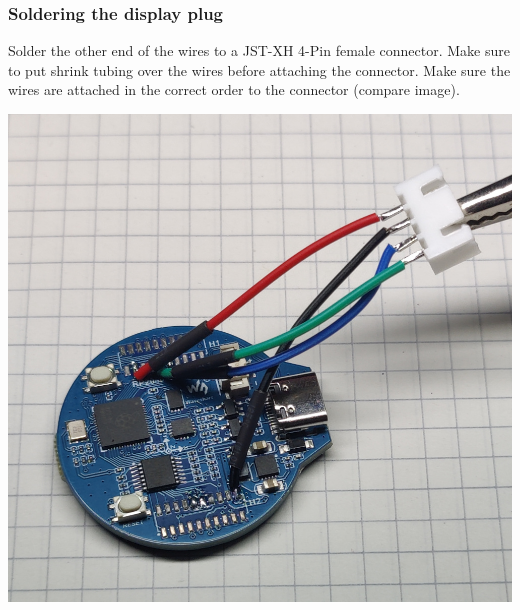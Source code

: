 \documentclass[]{article}
\begin{document}
\subsubsection{Soldering the display plug}
\begin{minipage}[t]{0.5\linewidth}
	\vspace{0pt}
	Solder the other end of the wires to a JST-XH 4-Pin female connector. Make sure to put shrink tubing over the wires before attaching the connector. Make sure the wires are attached in the correct order to the connector (compare image).
\end{minipage}
\hfill
\begin{minipage}[t]{0.4\linewidth}
	\vspace{0pt}
	\includegraphics[width=\linewidth]{images/01_displayunit/05_solder_wires_to_plug.jpg}
\end{minipage}
\end{document}
